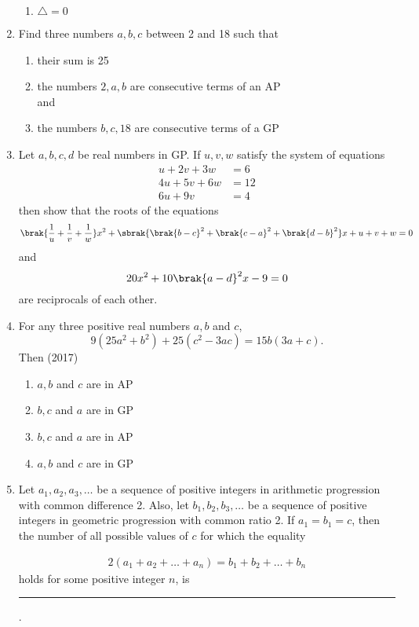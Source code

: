 \begin{enumerate}[label=\thesubsection.\arabic*,ref=\thesubsection.\theenumi]
\begin{multicols}{4}
\begin{enumerate}
                    \item $\triangle=0$
                \end{enumerate}
                \end{multicols}
    \item Find three numbers $a, b, c$ between 2 and 18 such that
\begin{enumerate}    
    \item their sum is 25
    \item the numbers $2, a, b$ are consecutive terms of an AP
    \\
    and
    \item the numbers $b, c, 18$ are consecutive terms of a GP\hfill{}
    \end{enumerate}
%  
      \item  Let $ a, b, c, d $ be real numbers in GP. If $u, v, w$ satisfy the system of equations  
%    
	      \hfill {}
%      
\begin{align*}
	u+2v+3w&=6  
	  \\
	  4u+5v+6w&=12 
	  \\
	  6u+9v&=4 
\end{align*}
      then show that the roots of the equations 
		$$\brak{\frac{1}{u}+\frac{1}{v}+\frac{1}{w}}x^{2}+\sbrak{\brak{b-c}^{2}+\brak{c-a}^{2}+\brak{d-b}^{2}}x+u+v+w=0 $$ and $$ 20x^{2}+10\brak{a-d}^{2}x-9=0 $$ are reciprocals of each other.
 \item For any three positive real numbers $a, b$ and $c$,  $$9(25a^2+b^2)+ 25(c^2-3ac) = 15b(3a+c).$$ Then \hfill (2017)
	 \begin{multicols}{2}
\begin{enumerate}    
  \item$a, b$ and $c$ are in AP
  \item{$b, c$ and $a$ are in GP}
  \columnbreak
  \item $b, c$ and $a$ are in AP
  \item{$a, b$ and $c$ are in GP}
  \end{enumerate}
  \end{multicols}
\item       Let $a_1, a_2, a_3, \dots $ be a sequence of positive integers in arithmetic progression with common difference 2. Also, let $b_1, b_2, b_3, \dots $ be a sequence of positive integers in geometric progression with common ratio 2. If $a_1 = b_1 = c$, then the number of all possible values of $c$ for which the equality 

\begin{align*}
     2(a_1 + a_2 + \dots + a_n) = b_1 + b_2 + \dots + b_n
\end{align*}
    holds for some positive integer $n$, is \rule{1cm}{0.1pt}.
\hfill {}
\end{enumerate}
